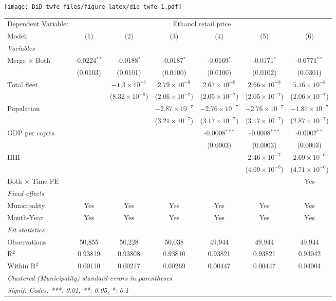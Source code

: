 \documentclass[
]{article}
\begin{document}
\texttt{[image: DiD\_twfe\_files/figure-latex/did\_twfe-1.pdf]}

\begin{tabular}{lcccccc}
\tabularnewline\midrule\midrule
Dependent Variable:&\multicolumn{6}{c}{Ethanol retail price}\\
Model:&(1) & (2) & (3) & (4) & (5) & (6)\\
\midrule \emph{Variables}&   &   &   &   &   &  \\
Merge $\times $ Both & -0.0224$^{**}$ & -0.0188$^{*}$ & -0.0187$^{*}$ & -0.0169$^{*}$ & -0.0171$^{*}$ & -0.0771$^{**}$\\
  &(0.0103) & (0.0101) & (0.0100) & (0.0100) & (0.0102) & (0.0301)\\
Total fleet &    & $-1.3\times 10^{-7}$ & $2.79\times 10^{-8}$ & $2.67\times 10^{-8}$ & $2.66\times 10^{-8}$ & $5.16\times 10^{-8}$\\
  &   & ($8.32\times 10^{-8}$) & ($2.06\times 10^{-7}$) & ($2.05\times 10^{-7}$) & ($2.05\times 10^{-7}$) & ($2.06\times 10^{-7}$)\\
Population &    &    & $-2.87\times 10^{-7}$ & $-2.76\times 10^{-7}$ & $-2.76\times 10^{-7}$ & $-1.87\times 10^{-7}$\\
  &   &    & ($3.21\times 10^{-7}$) & ($3.17\times 10^{-7}$) & ($3.17\times 10^{-7}$) & ($2.87\times 10^{-7}$)\\
GDP per capita &    &    &    & -0.0008$^{***}$ & -0.0008$^{***}$ & -0.0007$^{**}$\\
  &   &    &    & (0.0003) & (0.0003) & (0.0003)\\
HHI &    &    &    &    & $2.46\times 10^{-7}$ & $2.69\times 10^{-6}$\\
  &   &    &    &    & ($4.69\times 10^{-6}$) & ($4.71\times 10^{-6}$)\\
Both $\times$ Time FE &  &  &  &  &  & Yes\\
\midrule \emph{Fixed-effects}&   &   &   &   &   &  \\
Municipality & Yes & Yes & Yes & Yes & Yes & Yes\\
Month-Year & Yes & Yes & Yes & Yes & Yes & Yes\\
\midrule \emph{Fit statistics}&  & & & & & \\
Observations & 50,855&50,228&50,038&49,944&49,944&49,944\\
R$^2$ & 0.93819&0.93808&0.93810&0.93821&0.93821&0.94042\\
Within R$^2$ & 0.00110&0.00217&0.00269&0.00447&0.00447&0.04004\\
\midrule\midrule\multicolumn{7}{l}{\emph{Clustered (Municipality) standard-errors in parentheses}}\\
\multicolumn{7}{l}{\emph{Signif. Codes: ***: 0.01, **: 0.05, *: 0.1}}\\
\end{tabular}
\end{document}
